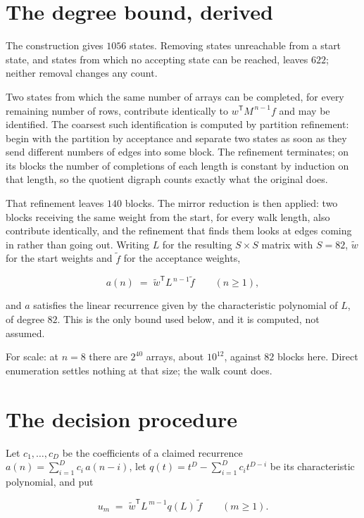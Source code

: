 \documentclass[11pt]{article}
\theoremstyle{definition}
\begin{document}
\section{The degree bound, derived}

The construction gives $1056$ states. Removing states unreachable from a start state, and states from which no accepting state can be reached, leaves $622$; neither removal changes any count.

Two states from which the same number of arrays can be completed, for every remaining number of rows, contribute identically to $w^{\mathsf T}M^{\,n-1}f$ and may be identified. The coarsest such identification is computed by partition refinement: begin with the partition by acceptance and separate two states as soon as they send different numbers of edges into some block. The refinement terminates; on its blocks the number of completions of each length is constant by induction on that length, so the quotient digraph counts exactly what the original does.

That refinement leaves $140$ blocks. The mirror reduction is then applied: two blocks receiving the same weight from the start, for every walk length, also contribute identically, and the refinement that finds them looks at edges coming in rather than going out. Writing $L$ for the resulting $S \times S$ matrix with $S = 82$, $\tilde w$ for the start weights and $\tilde f$ for the acceptance weights,

\[a(n) \;=\; \tilde w^{\mathsf T} L^{\,n-1} \tilde f \qquad (n \ge 1),\]

and $a$ satisfies the linear recurrence given by the characteristic polynomial of $L$, of degree $82$. This is the only bound used below, and it is computed, not assumed.

For scale: at $n = 8$ there are $2^{40}$ arrays, about $10^{12}$, against $82$ blocks here. Direct enumeration settles nothing at that size; the walk count does.

\section{The decision procedure}

Let $c_1,\dots,c_D$ be the coefficients of a claimed recurrence $a(n) = \sum_{i=1}^{D} c_i\,a(n-i)$, let $q(t) = t^{D} - \sum_{i=1}^{D} c_i t^{D-i}$ be its characteristic polynomial, and put

\[u_m \;=\; \tilde w^{\mathsf T} L^{\,m-1} q(L)\,\tilde f \qquad (m \ge 1).\]
\end{document}
